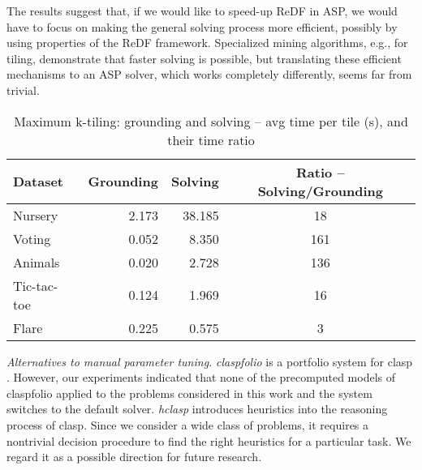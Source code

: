 The results suggest that, if we would like to speed-up ReDF in ASP, we would have to focus on making the general solving process more efficient, possibly by using properties of the ReDF framework. Specialized mining algorithms, e.g., for tiling, demonstrate that faster solving is possible, but translating these efficient mechanisms to an ASP solver, which works completely differently, seems far from trivial.

\begin{table}\footnotesize
  \caption{Maximum k-tiling: grounding and solving -- avg time per tile (s), and their time ratio}
  \label{table:steps-time}
\vspace{-10pt}
\begin{center}
\begin{tabular}{lrrc}
  Dataset & Grounding & \phantom{text} Solving & \phantom{aaa} Ratio -- Solving/Grounding \\ \hline
Nursery     &2.173&38.185 & 18 \\
Voting      &0.052&8.350 & 161  \\
Animals     &0.020&2.728 & 136 \\
Tic-tac-toe &0.124&1.969 & 16  \\
Flare       &0.225&0.575 & 3
\end{tabular}
\end{center}
\end{table}

\textit{Alternatives to manual parameter tuning.} \textit{claspfolio} is a portfolio system for clasp \citep{gekakascsczi11a}. However, our experiments indicated that none of the precomputed models of claspfolio applied to the problems considered in this work and the system switches to the default solver. \textit{hclasp} \citep{conf/aaai/GebserKROSW13} introduces heuristics into the reasoning process of clasp. Since we consider a wide class of problems, it requires a nontrivial decision procedure to find the right heuristics for a particular task. We regard it as a possible direction for future research.

